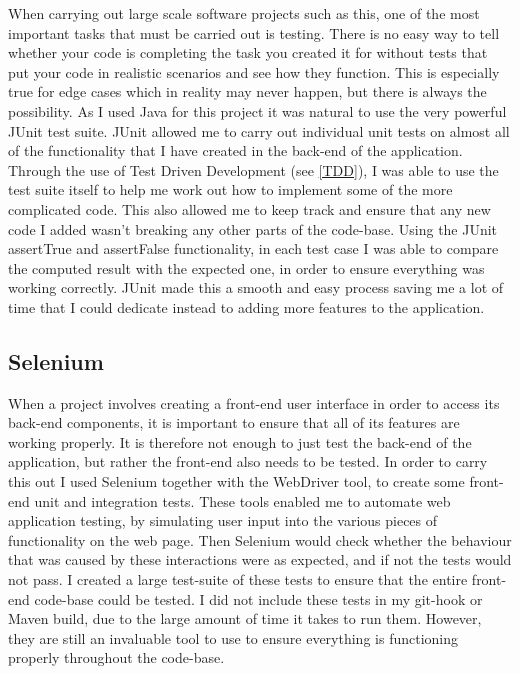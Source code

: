 When carrying out large scale software projects such as this, one of the most important tasks that must be carried out is testing. There is no easy way to tell whether your code is completing the task you created it for without tests that put your code in realistic scenarios and see how they function. This is especially true for edge cases which in reality may never happen, but there is always the possibility. As I used Java for this project it was natural to use the very powerful JUnit test suite. JUnit allowed me to carry out individual unit tests on almost all of the functionality that I have created in the back-end of the application. Through the use of Test Driven Development (see \ref{TDD}), I was able to use the test suite itself to help me work out how to implement some of the more complicated code. This also allowed me to keep track and ensure that any new code I added wasn't breaking any other parts of the code-base. Using the JUnit assertTrue and assertFalse functionality, in each test case I was able to compare the computed result with the expected one, in order to ensure everything was working correctly. JUnit made this a smooth and easy process saving me a lot of time that I could dedicate instead to adding more features to the application.

\subsection{Selenium}

When a project involves creating a front-end user interface in order to access its back-end components, it is important to ensure that all of its features are working properly. It is therefore not enough to just test the back-end of the application, but rather the front-end also needs to be tested. In order to carry this out I used Selenium together with the WebDriver tool, to create some front-end unit and integration tests. These tools enabled me to automate web application testing, by simulating user input into the various pieces of functionality on the web page. Then Selenium would check whether the behaviour that was caused by these interactions were as expected, and if not the tests would not pass. I created a large test-suite of these tests to ensure that the entire front-end code-base could be tested. I did not include these tests in my git-hook or Maven build, due to the large amount of time it takes to run them. However, they are still an invaluable tool to use to ensure everything is functioning properly throughout the code-base.

